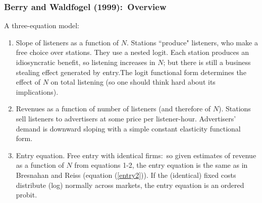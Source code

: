 \documentclass[notes=show]{beamer}
\begin{document}
\begin{frame}%

\frametitle{Berry and Waldfogel (1999):\ Overview}

A three-equation model:

\begin{enumerate}
\item Slope of listeners as a function of $N.$ Stations ``produce" listeners,
who make a free choice over stations. They use a nested logit. Each station
produces an idiosyncratic benefit, so listening increases in $N$; but there
is still a business stealing effect generated by entry.The logit functional
form determines the effect of $N$ on total listening (so one should think
hard about its implications).

\item Revenues as a function of number of listeners (and therefore of $N$).
Stations sell listeners to advertisers at some price per listener-hour.
Advertisers' demand is downward sloping with a simple constant elasticity
functional form.

\item Entry equation. Free entry with identical firms:\ so given estimates
of revenue as a function of $N$ from equations 1-2, the entry equation is
the same as in Bresnahan and Reiss (equation (\ref{entry2})). If the
(identical) fixed costs distribute (log) normally across markets, the entry
equation is an ordered probit.
\end{enumerate}

\end{frame}%
\end{document}
